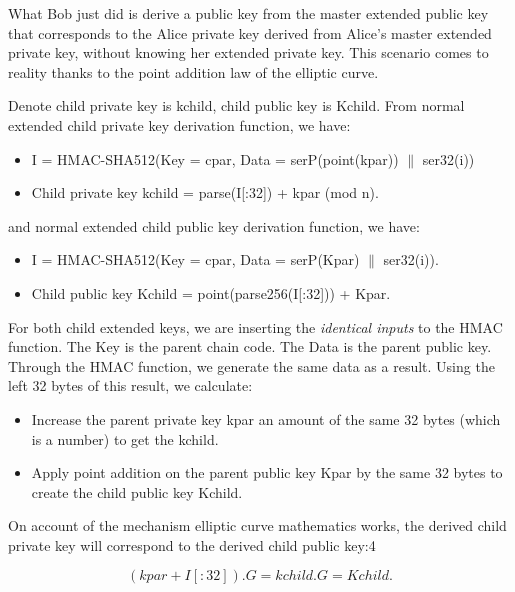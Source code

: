 What Bob just did is derive a public key from the master extended public key that corresponds to the Alice private key derived from Alice’s master extended private key, without knowing her extended private key. This scenario comes to reality thanks to the point addition law of the elliptic curve.

Denote child private key is kchild, child public key is Kchild. From normal extended child private key derivation function, we have:

\begin{itemize}
    \item I = HMAC-SHA512(Key = cpar, Data = serP(point(kpar)) $\parallel$ ser32(i))
    \item Child private key kchild = parse(I[:32]) +  kpar (mod n).
\end{itemize}

and normal extended child public key derivation function, we have:
\begin{itemize}
    \item I = HMAC-SHA512(Key = cpar, Data = serP(Kpar) $\parallel$ ser32(i)).
    \item Child public key Kchild = point(parse256(I[:32])) + Kpar.
\end{itemize}

For both child extended keys, we are inserting the \textit{identical inputs} to the HMAC function. The Key is the parent chain code. The Data is the parent public key. Through the HMAC function, we generate the same data as a result. Using the left 32 bytes of this result, we calculate:
\begin{itemize}
    \item Increase the parent private key kpar an amount of the same 32 bytes (which is a number) to get the kchild.

    \item Apply point addition on the parent public key Kpar by the same 32 bytes to create the child public key Kchild.
\end{itemize}

On account of the mechanism elliptic curve mathematics works, the derived child private key will correspond to the derived child public key:4

\begin{equation}
    (kpar + I[:32]) . G  =  kchild . G =  Kchild.
\end{equation}

